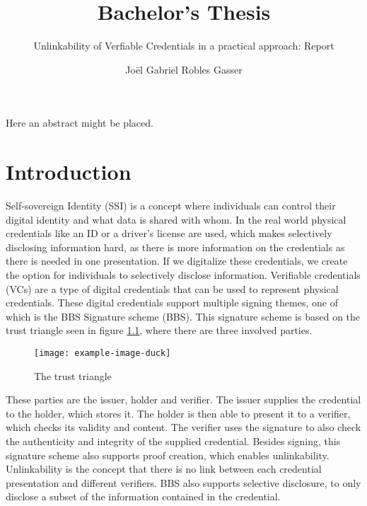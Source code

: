 \documentclass[
	a4paper               %
	,BCOR=0mm            %
	,bibliography=totoc   %
	,listof=totoc         %
	,monolingual
	,twoside=false
]{bfhthesis}              %
\begin{document}
\frontmatter

\title{Bachelor's Thesis}
\subtitle{Unlinkability of Verfiable Credentials in a practical approach: Report}
\author{Joël Gabriel Robles Gasser}

\maketitle

Here an abstract might be placed.


\tableofcontents

\mainmatter

\chapter{Introduction}
Self-sovereign Identity (SSI)\cite{self-sovereign-identity} is a concept where individuals can control their digital identity and what data is shared with whom.
In the real world physical credentials like an ID or a driver's license are used, which makes selectively disclosing information hard, as there is more information on the credentials as there is needed in one presentation.
If we digitalize these credentials, we create the option for individuals to selectively disclose information. 
Verifiable credentials (VCs)\cite{verifiable-credentials} are a type of digital credentials that can be used to represent physical credentials.
These digital credentials support multiple signing themes, one of which is the BBS Signature scheme (BBS)\cite{bbs-signature-scheme}.
This signature scheme is based on the trust triangle seen in figure \ref{fig:trusttringle}, where there are three involved parties.

\begin{figure}[h]
	\centering
	\texttt{[image: example-image-duck]}
	\caption{The trust triangle}
	\label{fig:trusttringle}
\end{figure}

These parties are the issuer, holder and verifier.
The issuer supplies the credential to the holder, which stores it. The holder is then able to present it to a verifier, which checks its validity and content.
The verifier uses the signature to also check the authenticity and integrity of the supplied credential.
Besides signing, this signature scheme also supports proof creation, which enables unlinkability.
Unlinkability is the concept that there is no link between each credential presentation and different verifiers.
BBS also supports selective disclosure, to only disclose a subset of the information contained in the credential.\\
\end{document}
